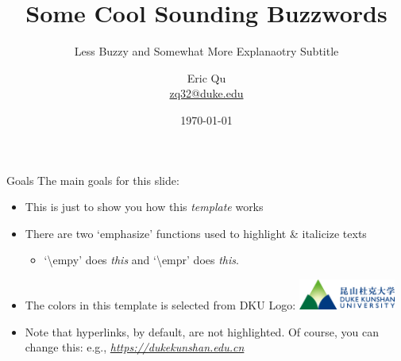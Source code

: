 \documentclass[pdf]{beamer}
\title[Buzz Words, maybe Clever Abbreviations]{Some Cool Sounding Buzzwords}
\subtitle{Less Buzzy and Somewhat More Explanaotry Subtitle}
\newcommand{\empy}[1]{{\color{DKULightBlue}\emph{#1}}}
\newcommand{\empr}[1]{{\color{DKUDarkBlue}\emph{#1}}}
\theoremstyle{remark}
\theoremstyle{definition}
\begin{document}
\author[Eric Qu, DKU]{
	\begin{tabular}{c} 
	\Large
	Eric Qu\\
    \footnotesize \href{mailto:zq32@duke.edu}{zq32@duke.edu}
\end{tabular}
\vspace{-4ex}}


\date{\today}

\begin{noheadline}
\begin{frame}\maketitle\end{frame}
\end{noheadline}



\begin{frame}{Goals}
The main goals for this slide:
\begin{itemize}
	\item This is just to show you how this \empy{template} works
	\item There are two `emphasize' functions used to highlight \& italicize texts
	\begin{itemize}
		\item `\textbackslash empy' does \empy{this} and `\textbackslash empr' does \empr{this}.
	\end{itemize}
	\item The colors in this template is selected from DKU Logo: 
	\includegraphics[height=0.4in]{./style_files_DKU/DKU_logo_full.png}
	\item Note that hyperlinks, by default, are not highlighted. Of course, you can change this: e.g., \empr{\href{https://dukekunshan.edu.cn}{https://dukekunshan.edu.cn}}
\end{itemize}
\end{frame}
\end{document}

